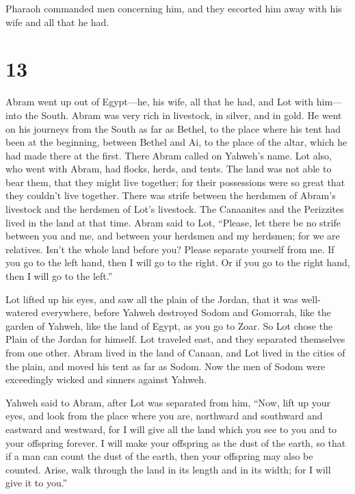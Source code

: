  Pharaoh commanded men concerning him, and they escorted
him away with his wife and all that he had.

\hypertarget{section-12}{%
\section{13}\label{section-12}}

 Abram went up out of Egypt---he, his wife, all that he had,
and Lot with him---into the South.  Abram was very rich in
livestock, in silver, and in gold.  He went on his journeys
from the South as far as Bethel, to the place where his tent had been at
the beginning, between Bethel and Ai,  to the place of the
altar, which he had made there at the first. There Abram called on
Yahweh's name.  Lot also, who went with Abram, had flocks,
herds, and tents.  The land was not able to bear them, that
they might live together; for their possessions were so great that they
couldn't live together.  There was strife between the
herdsmen of Abram's livestock and the herdsmen of Lot's livestock. The
Canaanites and the Perizzites lived in the land at that time.
 Abram said to Lot, ``Please, let there be no strife between
you and me, and between your herdsmen and my herdsmen; for we are
relatives.  Isn't the whole land before you? Please separate
yourself from me. If you go to the left hand, then I will go to the
right. Or if you go to the right hand, then I will go to the left.''

 Lot lifted up his eyes, and saw all the plain of the
Jordan, that it was well-watered everywhere, before Yahweh destroyed
Sodom and Gomorrah, like the garden of Yahweh, like the land of Egypt,
as you go to Zoar.  So Lot chose the Plain of the Jordan
for himself. Lot traveled east, and they separated themselves from one
other.  Abram lived in the land of Canaan, and Lot lived in
the cities of the plain, and moved his tent as far as Sodom.
 Now the men of Sodom were exceedingly wicked and sinners
against Yahweh.

 Yahweh said to Abram, after Lot was separated from him,
``Now, lift up your eyes, and look from the place where you are,
northward and southward and eastward and westward,  for I
will give all the land which you see to you and to your offspring
forever.  I will make your offspring as the dust of the
earth, so that if a man can count the dust of the earth, then your
offspring may also be counted.  Arise, walk through the
land in its length and in its width; for I will give it to you.''

